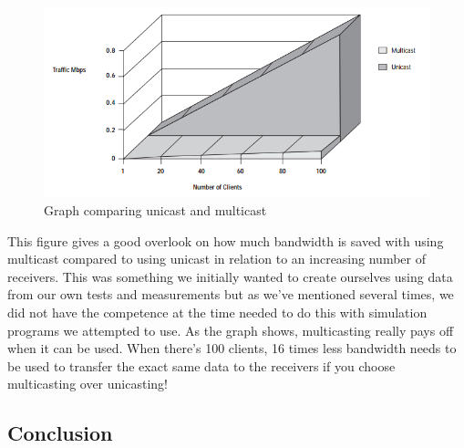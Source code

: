 \documentclass[9pt,a4paper]{acmproc}
\begin{document}
\begin{figure}[h!]
\includegraphics[width=\linewidth]{graph.png}
\caption{Graph comparing unicast and multicast}
\label{fig:graph}
\end{figure}

This figure gives a good overlook on how much bandwidth is saved with using multicast compared to using unicast in relation to an increasing number of receivers. This was something we initially wanted to create ourselves using data from our own tests and measurements but as we’ve mentioned several times, we did not have the competence at the time needed to do this with simulation programs we attempted to use. As the graph shows, multicasting really pays off when it can be used. When there's 100 clients, 16 times less bandwidth needs to be used to transfer the exact same data to the receivers if you choose multicasting over unicasting! \cite[s.~4]{graphSource}
\newline
\newline


\subsection{Conclusion}
\end{document}
